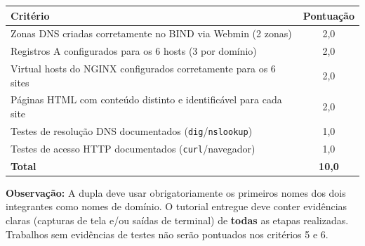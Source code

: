 \documentclass[11pt,a4paper]{article}
\begin{document}
\begin{center}
  \begin{tabular}{|p{10.5cm}|c|}
    \hline
    \textbf{Critério} & \textbf{Pontuação} \\
    \hline
    Zonas DNS criadas corretamente no BIND via Webmin (2 zonas) & 2,0 \\
    \hline
    Registros A configurados para os 6 hosts (3 por domínio) & 2,0 \\
    \hline
    Virtual hosts do NGINX configurados corretamente para os 6 sites & 2,0 \\
    \hline
    Páginas HTML com conteúdo distinto e identificável para cada site & 2,0 \\
    \hline
    Testes de resolução DNS documentados (\texttt{dig}/\texttt{nslookup}) & 1,0 \\
    \hline
    Testes de acesso HTTP documentados (\texttt{curl}/navegador) & 1,0 \\
    \hline
    \textbf{Total} & \textbf{10,0} \\
    \hline
  \end{tabular}
\end{center}

\vspace{0.5em}

\begin{alertbox}
  \textbf{Observação:} A dupla deve usar obrigatoriamente os primeiros nomes dos dois integrantes como nomes de domínio. O tutorial entregue deve conter evidências claras (capturas de tela e/ou saídas de terminal) de \textbf{todas} as etapas realizadas. Trabalhos sem evidências de testes não serão pontuados nos critérios 5 e 6.
\end{alertbox}
\end{document}
